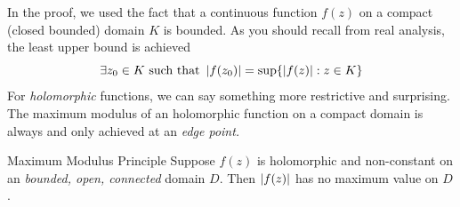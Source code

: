 


In the proof, we used the fact that a continuous function $f(z)$ on a compact (closed bounded) domain $K$ is bounded. As you should recall from real analysis, the least upper bound is achieved
\[\exists z_0\in K\text{ such that } \left| f(z_0)\right|=\sup\{\left| f(z)\right|:z\in K\}\] 
For \emph{holomorphic} functions, we can say something more restrictive and surprising. The maximum modulus of an holomorphic function on a compact domain is always and only achieved at an \emph{edge point.}


\begin{thm}{Maximum Modulus Principle}{}
Suppose $f(z)$ is holomorphic and non-constant on an \emph{bounded, open, connected} domain $D$. Then $\left| f(z)\right|$ has no maximum value on $D$.
\end{thm}



